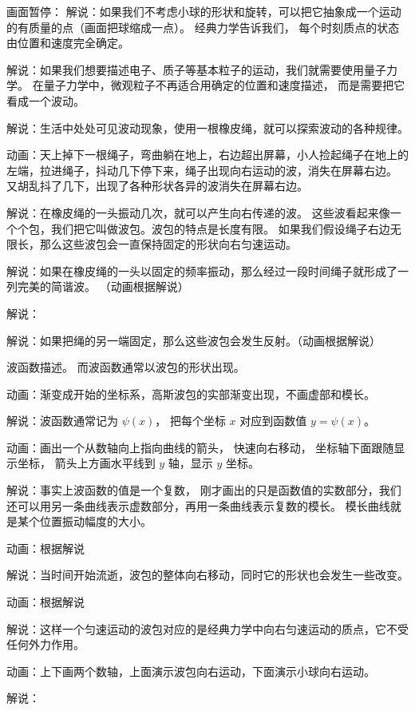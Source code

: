 画面暂停： 解说：如果我们不考虑小球的形状和旋转，可以把它抽象成一个运动的有质量的点（画面把球缩成一点）。 经典力学告诉我们， 每个时刻质点的状态由位置和速度完全确定。

解说：如果我们想要描述电子、质子等基本粒子的运动，我们就需要使用量子力学。 在量子力学中，微观粒子不再适合用确定的位置和速度描述， 而是需要把它看成一个波动。

解说：生活中处处可见波动现象，使用一根橡皮绳，就可以探索波动的各种规律。

动画：天上掉下一根绳子，弯曲躺在地上，右边超出屏幕，小人捡起绳子在地上的左端，拉进绳子，抖动几下停下来，绳子出现向右运动的波，消失在屏幕右边。 又胡乱抖了几下，出现了各种形状各异的波消失在屏幕右边。

解说：在橡皮绳的一头振动几次，就可以产生向右传递的波。 这些波看起来像一个个包，我们把它叫做波包。波包的特点是长度有限。 如果我们假设绳子右边无限长，那么这些波包会一直保持固定的形状向右匀速运动。

解说：如果在橡皮绳的一头以固定的频率振动，那么经过一段时间绳子就形成了一列完美的简谐波。
（动画根据解说）

解说：

解说：如果把绳的另一端固定，那么这些波包会发生反射。（动画根据解说）




波函数描述。 而波函数通常以波包的形状出现。

动画：渐变成开始的坐标系，高斯波包的实部渐变出现，不画虚部和模长。

解说：波函数通常记为 $\psi(x)$， 把每个坐标 $x$ 对应到函数值 $y = \psi(x)$。

动画：画出一个从数轴向上指向曲线的箭头， 快速向右移动， 坐标轴下面跟随显示坐标， 箭头上方画水平线到 $y$ 轴，显示 $y$ 坐标。

解说：事实上波函数的值是一个复数， 刚才画出的只是函数值的实数部分，我们还可以用另一条曲线表示虚数部分，再用一条曲线表示复数的模长。 模长曲线就是某个位置振动幅度的大小。

动画：根据解说

解说：当时间开始流逝，波包的整体向右移动，同时它的形状也会发生一些改变。

动画：根据解说

解说：这样一个匀速运动的波包对应的是经典力学中向右匀速运动的质点，它不受任何外力作用。

动画：上下画两个数轴，上面演示波包向右运动，下面演示小球向右运动。

解说：
